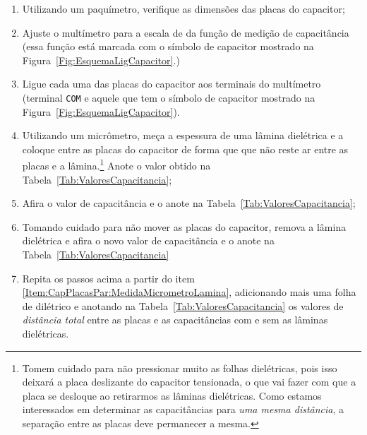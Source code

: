 \begin{enumerate}
	\item Utilizando um paquímetro, verifique as dimensões das placas do capacitor;
	\item Ajuste o multímetro para a escala de  da função de medição de capacitância (essa função está marcada com o símbolo de capacitor mostrado na Figura~\ref{Fig:EsquemaLigCapacitor}.)
	\item Ligue cada uma das placas do capacitor aos terminais do multímetro (terminal \texttt{COM} e aquele que tem o símbolo de capacitor mostrado na Figura~\ref{Fig:EsquemaLigCapacitor}).
	\item Utilizando um micrômetro, meça a espessura de uma lâmina dielétrica e a coloque entre as placas do capacitor de forma que que não reste ar entre as placas e a lâmina.\footnote{Tomem cuidado para não pressionar muito as folhas dielétricas, pois isso deixará a placa deslizante do capacitor tensionada, o que vai fazer com que a placa se desloque ao retirarmos as lâminas dielétricas. Como estamos interessados em determinar as capacitâncias para \emph{uma mesma distância}, a separação entre as placas deve permanecer a mesma.}  Anote o valor obtido na Tabela~\ref{Tab:ValoresCapacitancia};\label{Item:CapPlacasPar:MedidaMicrometroLamina}
	\item Afira o valor de capacitância e o anote na Tabela~\ref{Tab:ValoresCapacitancia};
	\item Tomando cuidado para não mover as placas do capacitor, remova a lâmina dielétrica e afira o novo valor de capacitância e o anote na Tabela~\ref{Tab:ValoresCapacitancia}
	\item Repita os passos acima a partir do item \ref{Item:CapPlacasPar:MedidaMicrometroLamina}, adicionando mais uma folha de dilétrico e anotando na Tabela~\ref{Tab:ValoresCapacitancia} os valores de \emph{distância total} entre as placas e as capacitâncias com e sem as lâminas dielétricas.
\end{enumerate}

\cleardoublepage

